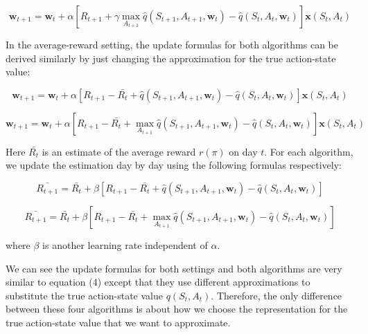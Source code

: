 \documentclass{article}
\begin{document}
\begin{equation}
	\mathbf{w}_{t+1} = \mathbf{w}_{t}+\alpha \left [ R_{t+1}+\gamma \max_{A_{t+1}}\hat{q}\left ( S_{t+1}, A_{t+1}, \mathbf{w}_{t} \right ) -\hat{q}\left ( S_{t}, A_{t}, \mathbf{w}_{t} \right ) \right ]\mathbf{x}\left ( S_{t}, A_{t} \right )
\end{equation}

\indent In the average-reward setting, the update formulas for both algorithms can be derived similarly by just changing the approximation for the true action-state value:

\begin{equation}
	\mathbf{w}_{t+1} = \mathbf{w}_{t}+\alpha \left [ R_{t+1}-\bar{R_{t}}+\hat{q}\left ( S_{t+1}, A_{t+1}, \mathbf{w}_{t} \right ) -\hat{q}\left ( S_{t}, A_{t}, \mathbf{w}_{t} \right ) \right ]\mathbf{x}\left ( S_{t}, A_{t} \right )
\end{equation}

\begin{equation}
	\mathbf{w}_{t+1} = \mathbf{w}_{t}+\alpha \left [ R_{t+1}-\bar{R_{t}}+\max_{A_{t+1}}\hat{q}\left ( S_{t+1}, A_{t+1}, \mathbf{w}_{t} \right ) -\hat{q}\left ( S_{t}, A_{t}, \mathbf{w}_{t} \right ) \right ]\mathbf{x}\left ( S_{t}, A_{t} \right )
\end{equation}

\noindent Here $\bar{R_{t}}$ is an estimate of the average reward $r\left ( \pi  \right )$ on day $t$. For each algorithm, we update the estimation day by day using the following formulas respectively:

\begin{equation}
	\bar{R_{t+1}} = \bar{R_{t}}+\beta \left [ R_{t+1}-\bar{R_{t}}+\hat{q}\left ( S_{t+1}, A_{t+1}, \mathbf{w}_{t} \right ) -\hat{q}\left ( S_{t}, A_{t}, \mathbf{w}_{t} \right ) \right ]
\end{equation}


\begin{equation}
	\bar{R_{t+1}} = \bar{R_{t}}+\beta \left [ R_{t+1}-\bar{R_{t}}+\max_{A_{t+1}}\hat{q}\left ( S_{t+1}, A_{t+1}, \mathbf{w}_{t} \right ) -\hat{q}\left ( S_{t}, A_{t}, \mathbf{w}_{t} \right ) \right ]
\end{equation}

\noindent where $\beta$ is another learning rate independent of $\alpha$.

\indent We can see the update formulas for both settings and both algorithms are very similar to equation (4) except that they use different approximations to substitute the true action-state value $q\left ( S_{t}, A_{t} \right )$. Therefore, the only difference between these four algorithms is about how we choose the representation for the true action-state value that we want to approximate.
\end{document}
